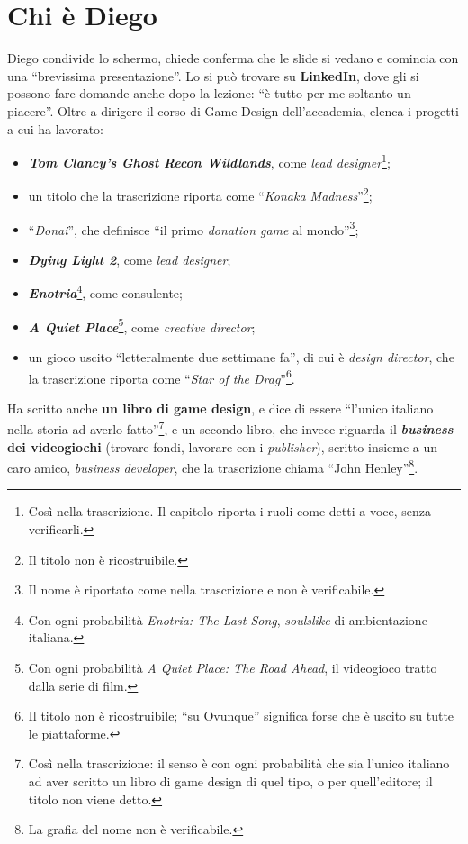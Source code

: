 \section{Chi è Diego}
\label{a15:sec:diego}

Diego condivide lo schermo, chiede conferma che le slide si vedano e comincia con una
``brevissima presentazione''. Lo si può trovare su \textbf{LinkedIn}, dove gli si possono
fare domande anche dopo la lezione: ``è tutto per me soltanto un piacere''. Oltre a
dirigere il corso di Game Design dell'accademia, elenca i progetti a cui ha lavorato:
\begin{itemize}
  \item \textbf{\emph{Tom Clancy's Ghost Recon Wildlands}}, come \emph{lead
        designer}\footnote{Così nella trascrizione. Il capitolo riporta i ruoli come detti a
        voce, senza verificarli.};
  \item un titolo che la trascrizione riporta come ``\emph{Konaka Madness}''\footnote{Il
        titolo non è ricostruibile.};
  \item ``\emph{Donai}'', che definisce ``il primo \emph{donation game} al
        mondo''\footnote{Il nome è riportato come nella trascrizione e non è
        verificabile.};
  \item \textbf{\emph{Dying Light 2}}, come \emph{lead designer};
  \item \textbf{\emph{Enotria}}\footnote{Con ogni probabilità \emph{Enotria: The Last Song},
        \emph{soulslike} di ambientazione italiana.}, come consulente;
  \item \textbf{\emph{A Quiet Place}}\footnote{Con ogni probabilità \emph{A Quiet Place: The
        Road Ahead}, il videogioco tratto dalla serie di film.}, come \emph{creative
        director};
  \item un gioco uscito ``letteralmente due settimane fa'', di cui è \emph{design director},
        che la trascrizione riporta come ``\emph{Star of the Drag}''\footnote{Il titolo non è
        ricostruibile; ``su Ovunque'' significa forse che è uscito su tutte le piattaforme.}.
\end{itemize}
Ha scritto anche \textbf{un libro di game design}, e dice di essere ``l'unico italiano nella
storia ad averlo fatto''\footnote{Così nella trascrizione: il senso è con ogni probabilità
che sia l'unico italiano ad aver scritto un libro di game design di quel tipo, o per
quell'editore; il titolo non viene detto.}, e un secondo libro, che invece riguarda il
\textbf{\emph{business} dei videogiochi} (trovare fondi, lavorare con i \emph{publisher}),
scritto insieme a un caro amico, \emph{business developer}, che la trascrizione chiama
``John Henley''\footnote{La grafia del nome non è verificabile.}.

